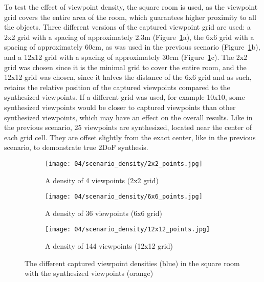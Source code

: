 To test the effect of viewpoint density, the square room is used, as the viewpoint grid covers the entire area of the room, which guarantees higher proximity to all the objects. Three different versions of the captured viewpoint grid are used: a 2x2 grid with a spacing of approximately 2.3m (Figure~\ref{fig:density_setup}a), the 6x6 grid with a spacing of approximately 60cm, as was used in the previous scenario (Figure~\ref{fig:density_setup}b), and a 12x12 grid with a spacing of approximately 30cm (Figure~\ref{fig:density_setup}c). The 2x2 grid was chosen since it is the minimal grid to cover the entire room, and the 12x12 grid was chosen, since it halves the distance of the 6x6 grid and as such, retains the relative position of the captured viewpoints compared to the synthesized viewpoints. If a different grid was used, for example 10x10, some synthesized viewpoints would be closer to captured viewpoints than other synthesized viewpoints, which may have an effect on the overall results.
Like in the previous scenario, 25 viewpoints are synthesized, located near the center of each grid cell. They are offset slightly from the exact center, like in the previous scenario, to demonstrate true 2DoF synthesis.

\begin{figure}
\centering
    \hfill
    \begin{subfigure}[t]{0.3\textwidth}
            \centering
            \texttt{[image: 04/scenario\_density/2x2\_points.jpg]}
            \caption{A density of 4 viewpoints (2x2 grid)}
    \end{subfigure}
    \hfill
    \begin{subfigure}[t]{0.3\textwidth}
            \centering
            \texttt{[image: 04/scenario\_density/6x6\_points.jpg]}
            \caption{A density of 36 viewpoints (6x6 grid)}
    \end{subfigure}
    \hfill
    \begin{subfigure}[t]{0.3\textwidth}
            \centering
            \texttt{[image: 04/scenario\_density/12x12\_points.jpg]}
            \caption{A density of 144 viewpoints (12x12 grid)}
    \end{subfigure}
    \hfill
  \caption[The different captured viewpoint densities in the square room]{The different captured viewpoint densities (blue) in the square room with the synthesized viewpoints (orange)} \label{fig:density_setup}
\end{figure}

